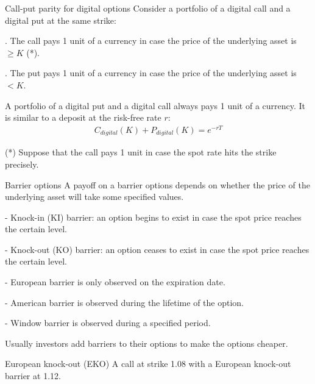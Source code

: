 \documentclass{beamer}
\begin{document}
\begin{frame}{Call-put parity for digital options}
\justify
Consider a portfolio of a digital call and a digital put at the same strike:

. The call pays 1 unit of a currency in case the price of the underlying asset is $\ge K$ (*).

. The put pays 1 unit of a currency in case the price of the underlying asset is $< K$.

\justify
A portfolio of a digital put and a digital call always pays 1 unit of a currency. It is similar to a deposit at the risk-free rate $r$:
\begin{align*}
C_{digital}(K) + P_{digital}(K) = e^{-rT}
\end{align*}

\justify
(*) Suppose that the call pays 1 unit in case the spot rate hits the strike precisely.
\end{frame}



\begin{frame}{Barrier options}
\justify
A payoff on a \alert{barrier options} depends on whether the price of the underlying asset will take some specified values.

\justify
- \alert{Knock-in (KI)} barrier: an option begins to exist in case the spot price reaches the certain level.

- \alert{Knock-out (KO)} barrier: an option ceases to exist in case the spot price reaches the certain level.

\justify
- European barrier is only observed on the expiration date.

- American barrier is observed during the lifetime of the option.

- Window barrier is observed during a specified period.

\justify
Usually investors add barriers to their options to make the options cheaper.
\end{frame}


\begin{frame}{European knock-out (EKO)}
\justify
A call at strike 1.08 with a European knock-out barrier at 1.12.
\centering
\end{frame}
\end{document}
